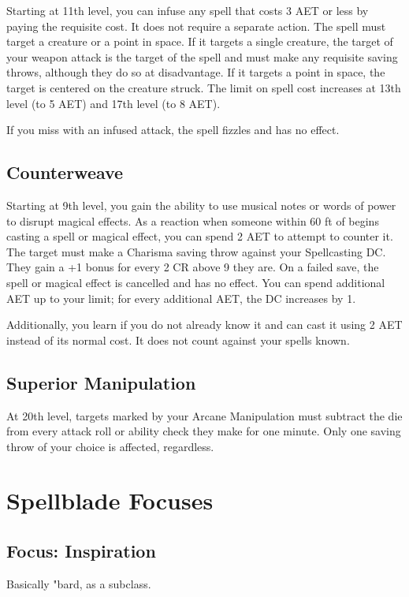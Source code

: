 Starting at 11th level, you can infuse any spell that costs 3 AET or less by paying the requisite cost. It does not require a separate action. The spell must target a creature or a point in space. If it targets a single creature, the target of your weapon attack is the target of the spell and must make any requisite saving throws, although they do so at disadvantage. If it targets a point in space, the target is centered on the creature struck. The limit on spell cost increases at 13th level (to 5 AET) and 17th level (to 8 AET).

If you miss with an infused attack, the spell fizzles and has no effect.

\subsection{Counterweave}

Starting at 9th level, you gain the ability to use musical notes or words of power to disrupt magical effects. As a reaction when someone within 60 ft of begins casting a spell or magical effect, you can spend 2 AET to attempt to counter it. The target must make a Charisma saving throw against your Spellcasting DC. They gain a +1 bonus for every 2 CR above 9 they are. On a failed save, the spell or magical effect is cancelled and has no effect. You can spend additional AET up to your limit; for every additional AET, the DC increases by 1.

Additionally, you learn \textit{} if you do not already know it and can cast it using 2 AET instead of its normal cost. It does not count against your spells known.

\subsection{Superior Manipulation}

At 20th level, targets marked by your Arcane Manipulation must subtract the die from every attack roll or ability check they make for one minute. Only one saving throw of your choice is affected, regardless.

\section{Spellblade Focuses}
\subsection{Focus: Inspiration}
Basically "bard, as a subclass.

